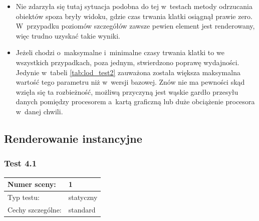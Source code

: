 \documentclass[a4paper,twoside,12pt]{book}
\begin{document}
\begin{itemize}
    \item Nie zdarzyła się tutaj sytuacja podobna do tej w~testach metody odrzucania obiektów spoza bryły widoku, gdzie czas trwania klatki osiągnął prawie zero. W~przypadku poziomów szczegółów zawsze pewien element jest renderowany, więc trudno uzyskać takie wyniki.
    \item Jeżeli chodzi o~maksymalne i~minimalne czasy trwania klatki to we wszystkich przypadkach, poza jednym, stwierdzono poprawę wydajności. Jedynie w~tabeli \ref{tab:lod_test2} zauważona została większa maksymalna wartość tego parametru niż w~wersji bazowej. Znów nie ma pewności skąd wzięła się ta rozbieżność, możliwą przyczyną jest wąskie gardło przesyłu danych pomiędzy procesorem a~kartą graficzną lub duże obciążenie procesora w~danej chwili.
\end{itemize}



\subsection{Renderowanie instancyjne}
\subsubsection{Test 4.1}
\begin{tabular}{|l||l|}
\hline
Numer sceny: & 1 \\
\hline
Typ testu: & statyczny \\
\hline
Cechy szczególne: & standard \\
\hline
\end{tabular}\\

\vbox{}
\end{document}
